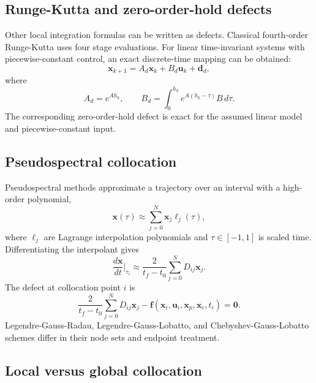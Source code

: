 \documentclass[11pt]{article}
\newcommand{\vect}[1]{\boldsymbol{#1}}
\newcommand{\xp}{\vect{x}_p}
\newcommand{\xc}{\vect{x}_c}
\newcommand{\xstate}{\vect{x}}
\newcommand{\uvec}{\vect{u}}
\newcommand{\fvec}{\vect{f}}
\begin{document}
\subsection{Runge-Kutta and zero-order-hold defects}

Other local integration formulas can be written as defects. Classical fourth-order Runge-Kutta uses four stage evaluations. For linear time-invariant systems with piecewise-constant control, an exact discrete-time mapping can be obtained:
\begin{equation}
\xstate_{k+1}=A_d\xstate_k+B_d\uvec_k+\vect{d}_d,
\end{equation}
where
\begin{equation}
A_d=e^{Ah_k}, \qquad
B_d=\int_0^{h_k}e^{A(h_k-\tau)}B\,d\tau.
\end{equation}
The corresponding zero-order-hold defect is exact for the assumed linear model and piecewise-constant input.

\subsection{Pseudospectral collocation}

Pseudospectral methods approximate a trajectory over an interval with a high-order polynomial,
\begin{equation}
\xstate(\tau)\approx\sum_{j=0}^{N}\xstate_j\ell_j(\tau),
\end{equation}
where $\ell_j$ are Lagrange interpolation polynomials and $\tau\in[-1,1]$ is scaled time. Differentiating the interpolant gives
\begin{equation}
\frac{d\xstate}{dt}\bigg|_{\tau_i}
\approx \frac{2}{t_f-t_0}\sum_{j=0}^{N}D_{ij}\xstate_j.
\end{equation}
The defect at collocation point $i$ is
\begin{equation}
\frac{2}{t_f-t_0}\sum_{j=0}^{N}D_{ij}\xstate_j
-\fvec(\xstate_i,\uvec_i,\xp,\xc,t_i)=\vect{0}.
\end{equation}
Legendre-Gauss-Radau, Legendre-Gauss-Lobatto, and Chebyshev-Gauss-Lobatto schemes differ in their node sets and endpoint treatment.

\subsection{Local versus global collocation}
\end{document}
